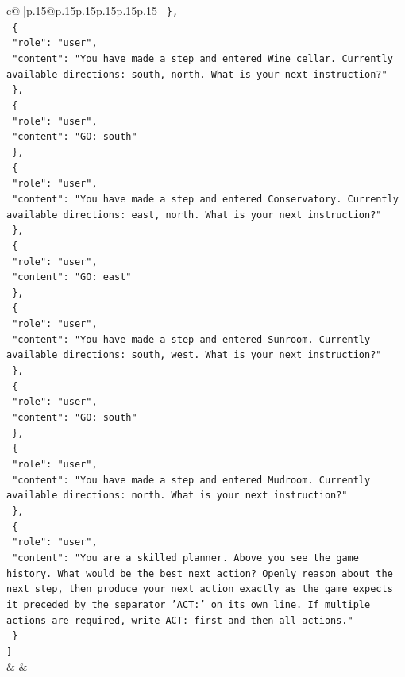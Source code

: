 \documentclass{article}
\begin{document}
{\begin{supertabular}{c@{$\;$}|p{.15\linewidth}@{}p{.15\linewidth}p{.15\linewidth}p{.15\linewidth}p{.15\linewidth}p{.15\linewidth}}
{{{\texttt{  \},} \\
\texttt{  \{} \\
\texttt{    "role": "user",} \\
\texttt{    "content": "You have made a step and entered Wine cellar. Currently available directions: south, north. What is your next instruction?"} \\
\texttt{  \},} \\
\texttt{  \{} \\
\texttt{    "role": "user",} \\
\texttt{    "content": "GO: south"} \\
\texttt{  \},} \\
\texttt{  \{} \\
\texttt{    "role": "user",} \\
\texttt{    "content": "You have made a step and entered Conservatory. Currently available directions: east, north. What is your next instruction?"} \\
\texttt{  \},} \\
\texttt{  \{} \\
\texttt{    "role": "user",} \\
\texttt{    "content": "GO: east"} \\
\texttt{  \},} \\
\texttt{  \{} \\
\texttt{    "role": "user",} \\
\texttt{    "content": "You have made a step and entered Sunroom. Currently available directions: south, west. What is your next instruction?"} \\
\texttt{  \},} \\
\texttt{  \{} \\
\texttt{    "role": "user",} \\
\texttt{    "content": "GO: south"} \\
\texttt{  \},} \\
\texttt{  \{} \\
\texttt{    "role": "user",} \\
\texttt{    "content": "You have made a step and entered Mudroom. Currently available directions: north. What is your next instruction?"} \\
\texttt{  \},} \\
\texttt{  \{} \\
\texttt{    "role": "user",} \\
\texttt{    "content": "You are a skilled planner. Above you see the game history. What would be the best next action? Openly reason about the next step, then produce your next action exactly as the game expects it preceded by the separator 'ACT:' on its own line. If multiple actions are required, write ACT: first and then all actions."} \\
\texttt{  \}} \\
\texttt{{]}} \\
            }
        }
    }
    & & \\ \\


\end{supertabular}}
\end{document}
